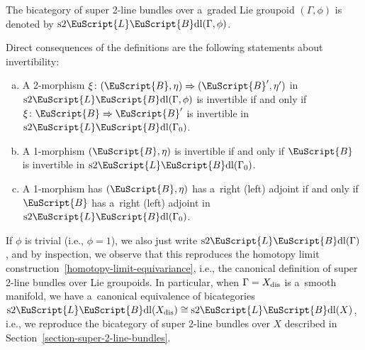\documentclass[10pt,a4paper]{amsart}
\numberwithin{equation}{section}
\def\mathscr#1{\EuScript{#1}}
\newcommand{\LineBdl}{\mathscr{L}\mathscr{B}\mathrm{dl}}
\newcommand{\stwoLineBdl}{\mathrm{s}2\LineBdl}
\begin{document}
\begin{Definition} \label{The bicategory of super 2-line bundles definition}
The bicategory of super 2-line bundles over a~graded Lie groupoid $(\Gamma,\phi)$ is denoted by $\stwoLineBdl(\Gamma,\phi)$.
\end{Definition}


\begin{Remark} \label{Inverse and adjoint of graded-equivariant 1-morphisms}
 Direct consequences of the definitions are the following statements about invertibility:
\begin{enumerate}[(a)]\itemsep=0pt
\item
 A 2-morphism $\xi\colon (\mathscr{B},\eta)\Rightarrow (\mathscr{B}',\eta')$ in $\stwoLineBdl(\Gamma,\phi)$ is invertible if and only if $\xi\colon \mathscr{B} \Rightarrow \mathscr{B}'$
is invertible in $\stwoLineBdl(\Gamma_0)$.

\item
A 1-morphism $(\mathscr{B},\eta)$ is invertible if and only if $\mathscr{B}$ is invertible in $\stwoLineBdl(\Gamma_0)$.

\item
A 1-morphism has $(\mathscr{B},\eta)$ has a~right (left)
 adjoint if and only if $\mathscr{B}$ has a~right (left) adjoint in $\stwoLineBdl(\Gamma_0)$.
\end{enumerate}
\end{Remark}

\begin{Remark}
\label{graded-equivariant-over-a-manifold}
If $\phi$ is trivial (i.e., $\phi=1$), we also just write
$\stwoLineBdl(\Gamma)$, and by inspection, we observe that this reproduces the homotopy limit construction~\eqref{homotopy-limit-equivariance}, i.e., the canonical definition of super 2-line bundles over Lie groupoids. In particular, when $\Gamma=X_{\rm dis}$ is a~smooth manifold, we have a~canonical equivalence of bicategories
$
\stwoLineBdl(X_{\rm dis})\cong \stwoLineBdl(X)$,
i.e., we reproduce the bicategory of super 2-line bundles over $X$ described in Section~\ref{section-super-2-line-bundles}.
\end{Remark}
\end{document}
